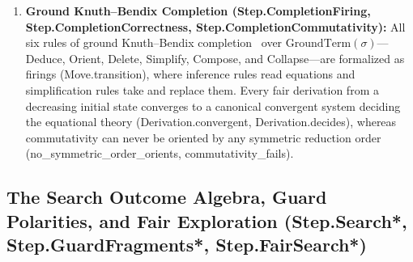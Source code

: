 \documentclass[11pt,a4paper]{article}
\theoremstyle{definition}
\DeclareRobustCommand{\lean}[1]{%
  \ifmmode\text{\normalfont\ttfamily\footnotesize\detokenize{#1}}%
  \else{\normalfont\footnotesize\leanurl{#1}}\fi}
\def\lean#1{#1}%
\begin{document}
\begin{enumerate}[leftmargin=2em, nosep]
  \item \textbf{Ground Knuth--Bendix Completion (\lean{Step.CompletionFiring}, \lean{Step.CompletionCorrectness}, \lean{Step.CompletionCommutativity}):}
  All six rules of ground Knuth--Bendix completion~\cite{KnuthBendix1970Simple} over $\mathrm{GroundTerm}(\sigma)$---Deduce, Orient, Delete, Simplify, Compose, and Collapse---are formalized as firings (\lean{Move.transition}), where inference rules read equations and simplification rules take and replace them. Every fair derivation from a decreasing initial state converges to a canonical convergent system deciding the equational theory (\lean{Derivation.convergent}, \lean{Derivation.decides}), whereas commutativity can never be oriented by any symmetric reduction order (\lean{no_symmetric_order_orients}, \lean{commutativity_fails}).
\end{enumerate}

\subsection{The Search Outcome Algebra, Guard Polarities, and Fair Exploration (\lean{Step.Search*}, \lean{Step.GuardFragments*}, \lean{Step.FairSearch*})}
\end{document}
